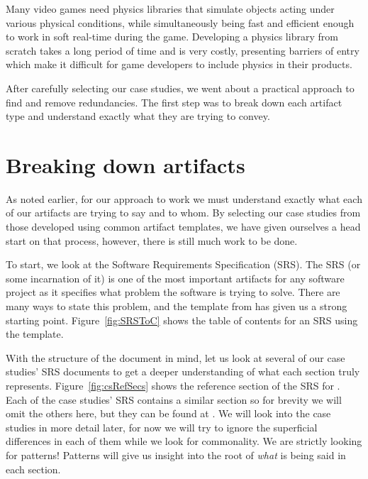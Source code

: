 {Many video games need physics libraries that simulate 
 objects acting under various physical conditions, while simultaneously being 
 fast and efficient enough to work in soft real-time during the game. 
 Developing a physics library from scratch takes a long period of time and is 
 very costly, presenting barriers of entry which make it difficult for game 
 developers to include physics in their products.}
{}

After carefully selecting our case studies, we went about a practical approach
to find and remove redundancies. The first step was to break down each artifact
type and understand exactly what they are trying to convey.


\section{Breaking down artifacts}

As noted earlier, for our approach to work we must understand exactly what each
of our artifacts are trying to say and to whom. By selecting our case studies 
from those developed using common artifact templates, we have given ourselves a
head start on that process, however, there is still much work to be done.

To start, we look at the Software Requirements Specification (SRS). The SRS
(or some incarnation of it) is one of the most important artifacts for any
software project as it specifies what problem the software is trying to solve.
There are many ways to state this problem, and the template from \smithea{} has 
given us a strong starting point. Figure~\ref{fig:SRSToC} shows the table of 
contents for an SRS using the \smithea{} template.


With the structure of the document in mind, let us look at several of our case
studies' SRS documents to get a deeper understanding of what each section truly
represents. Figure~\ref{fig:csRefSecs} shows the reference section of the SRS 
for . Each of the case studies' SRS contains a similar section so for 
brevity we will omit the others here, but they can be found at . 
We will look into the case studies in more detail later, for now we will try to 
ignore the superficial differences in each of them while we look for 
commonality. We are strictly looking for patterns! Patterns will give us 
insight into the root of \emph{what} is being said in each section.

